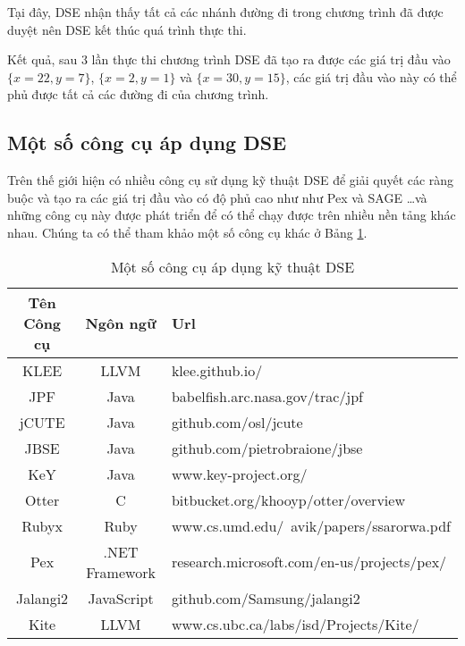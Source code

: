 Tại đây, DSE nhận thấy tất cả các nhánh đường đi trong chương trình đã được duyệt nên DSE kết thúc quá trình thực thi. 

Kết quả, sau $ 3 $ lần thực thi chương trình DSE đã tạo ra được các giá trị đầu vào $ \{x = 22, y = 7\} $, $ \{x = 2, y = 1\} $ và $ \{x = 30, y = 15\} $, các giá trị đầu vào này có thể phủ được tất cả các đường đi của chương trình.
	
\subsection{Một số công cụ áp dụng DSE}	

Trên thế giới hiện có nhiều công cụ sử dụng kỹ thuật DSE để giải quyết
các ràng buộc và tạo ra các giá trị đầu vào có độ phủ cao như như Pex
\cite{tillmann2008pex} và SAGE \cite{godefroid2008automated}\dots và
những công cụ này được phát triển để có thể chạy được trên nhiều nền
tảng khác nhau. Chúng ta có thể tham khảo một số công cụ khác ở Bảng \ref{tbl:DSETools}.
		
\begin{table}[H]
  \centering
  \label{tbl:DSETools}
  \caption{Một số công cụ áp dụng kỹ thuật DSE}
  \begin{tabular} {|c|c|l|}
    \hline 
    \textbf{Tên Công cụ} & \textbf{Ngôn ngữ} & \textbf{Url} \\ 
    \hline 
    KLEE & LLVM & klee.github.io/ \\ 
    \hline 
    JPF	 & Java	& babelfish.arc.nasa.gov/trac/jpf \\
    \hline 
    jCUTE &	Java &	github.com/osl/jcute \\
    \hline 
    JBSE	& Java	 & github.com/pietrobraione/jbse \\
    \hline 
    KeY &	Java &	www.key-project.org/ \\	    
    \hline 
    Otter &	C	& bitbucket.org/khooyp/otter/overview \\
    \hline 
    Rubyx & 	Ruby &	www.cs.umd.edu/~avik/papers/ssarorwa.pdf \\
    \hline 
    Pex	& .NET Framework	 & research.microsoft.com/en-us/projects/pex/ \\
    \hline 
    Jalangi2 &	JavaScript &	github.com/Samsung/jalangi2 \\
    \hline 
    Kite &	LLVM &	www.cs.ubc.ca/labs/isd/Projects/Kite/ \\
    \hline 
  \end{tabular} 
\end{table}
	
